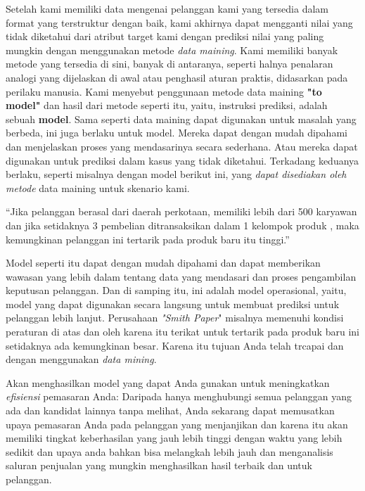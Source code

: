 \par Setelah kami memiliki data mengenai pelanggan kami yang tersedia dalam format yang terstruktur dengan baik, kami akhirnya dapat mengganti nilai yang tidak diketahui dari atribut target kami dengan prediksi nilai yang paling mungkin dengan menggunakan metode\textit{ data maining}. Kami memiliki banyak metode yang tersedia di sini, banyak di antaranya, seperti halnya penalaran analogi yang dijelaskan di awal atau penghasil aturan praktis, didasarkan pada perilaku manusia. Kami menyebut penggunaan metode data maining \textbf{"to model"} dan hasil dari metode seperti itu, yaitu, instruksi prediksi, adalah sebuah \textbf{model}. Sama seperti data maining dapat digunakan untuk masalah yang berbeda, ini juga berlaku untuk model. Mereka dapat dengan mudah dipahami dan menjelaskan proses yang mendasarinya secara sederhana. Atau mereka dapat digunakan untuk prediksi dalam kasus yang tidak diketahui. Terkadang keduanya berlaku, seperti misalnya dengan model berikut ini, yang\textit{ dapat disediakan oleh metode} data maining untuk skenario kami.

\par “Jika pelanggan berasal dari daerah perkotaan, memiliki lebih dari 500 karyawan dan jika setidaknya 3 pembelian ditransaksikan dalam 1 kelompok produk , maka kemungkinan pelanggan ini tertarik pada produk baru itu tinggi.”

\par  Model seperti itu dapat dengan mudah dipahami dan dapat memberikan wawasan yang lebih dalam tentang data yang mendasari dan proses pengambilan keputusan pelanggan. Dan di samping itu, ini adalah model operasional, yaitu, model yang dapat digunakan secara langsung untuk membuat prediksi untuk pelanggan lebih lanjut. Perusahaan \textit{"Smith Paper}" misalnya memenuhi kondisi peraturan di atas dan oleh karena itu terikat untuk tertarik pada produk baru ini setidaknya ada kemungkinan besar. Karena itu tujuan Anda telah trcapai dan dengan menggunakan \textit{data mining}.

\par  Akan menghasilkan model yang dapat Anda gunakan untuk meningkatkan \textit{efisiensi} pemasaran Anda: Daripada hanya menghubungi semua pelanggan yang ada dan kandidat lainnya tanpa melihat, Anda sekarang dapat memusatkan upaya pemasaran Anda pada pelanggan yang menjanjikan dan karena itu akan memiliki tingkat keberhasilan yang jauh lebih tinggi dengan waktu yang lebih sedikit dan upaya anda bahkan bisa melangkah lebih jauh dan menganalisis saluran penjualan yang mungkin menghasilkan hasil terbaik dan untuk pelanggan.

